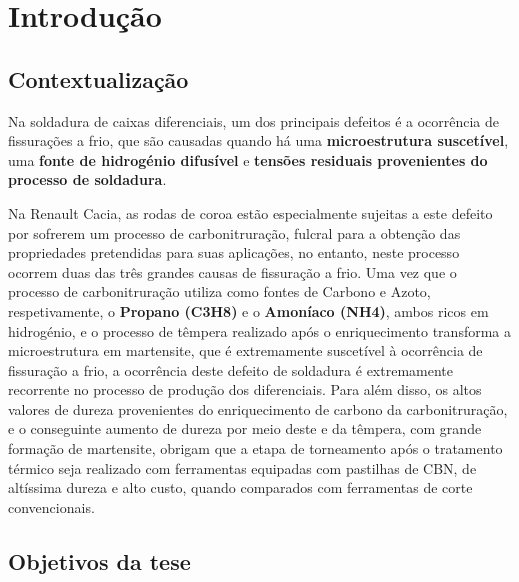 \chapter{Introdução} \label{ch:intro}
\setlength{\headheight}{13.6pt}

\section{Contextualização} \label{s:intro_contextualizacao}

Na soldadura de caixas diferenciais, um dos principais defeitos é a ocorrência de fissurações a frio, que são causadas quando há uma \textbf{microestrutura suscetível}, uma \textbf{fonte de hidrogénio difusível} e \textbf{tensões residuais provenientes do processo de soldadura}.
\par
Na Renault Cacia, as rodas de coroa estão especialmente sujeitas a este defeito por sofrerem um processo de carbonitruração, fulcral para a obtenção das propriedades pretendidas para suas aplicações, no entanto, neste processo ocorrem duas das três grandes causas de fissuração a frio. Uma vez que o processo de carbonitruração utiliza como fontes de Carbono e Azoto, respetivamente, o \textbf{Propano (C3H8)} e o \textbf{Amoníaco (NH4)}, ambos ricos em hidrogénio, e o processo de têmpera realizado após o enriquecimento transforma a microestrutura em martensite, que é extremamente suscetível à ocorrência de fissuração a frio, a ocorrência deste defeito de soldadura é extremamente recorrente no processo de produção dos diferenciais.
Para além disso, os altos valores de dureza provenientes do enriquecimento de carbono da carbonitruração, e o conseguinte aumento de dureza por meio deste e da têmpera, com grande formação de martensite, obrigam que a etapa de torneamento após o tratamento térmico seja realizado com ferramentas equipadas com pastilhas de CBN, de altíssima dureza e alto custo, quando comparados com ferramentas de corte convencionais.
\section{Objetivos da tese} \label{s:intro_objetivos}

